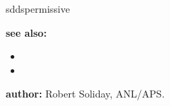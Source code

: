\begin{sddsprog}{sddspermissive}
\item \textbf{see also:}
\begin{itemize}
  \item {}
  \item {}
\end{itemize}

\item \textbf{author:} Robert Soliday, ANL/APS.
\end{sddsprog}

